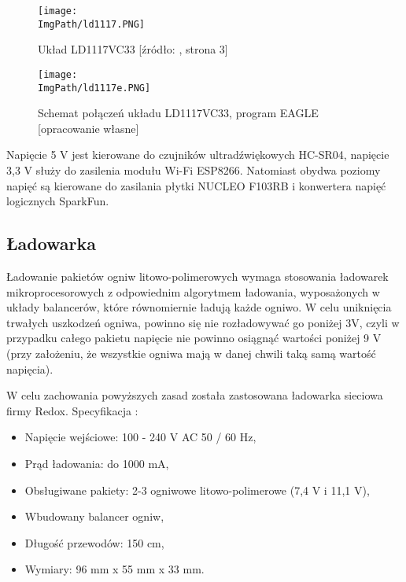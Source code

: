 \documentclass[a4paper,12pt,twoside,openany]{report}
\newcommand{\ImgPath}{.}
\begin{document}
\begin{figure}[!htbp]
	\begin{center}
\centering
\texttt{[image: \\ImgPath/ld1117.PNG]}
\end{center}
	\caption{Układ LD1117VC33 [źródło: \cite{LD1117}, strona 3]}
	\label{schematKomunikacji}
\end{figure}

\begin{figure}[!htbp]
	\begin{center}
\centering
\texttt{[image: \\ImgPath/ld1117e.PNG]}
\end{center}
	\caption{Schemat połączeń układu LD1117VC33, program EAGLE [opracowanie własne]}
	\label{schematKomunikacji}
\end{figure}

\newpage

Napięcie 5 V jest kierowane do czujników ultradźwiękowych HC-SR04, napięcie 3,3 V służy do zasilenia modułu Wi-Fi ESP8266. Natomiast obydwa poziomy napięć są kierowane do zasilania płytki NUCLEO F103RB i konwertera napięć logicznych SparkFun.

\subsection{Ładowarka}

Ładowanie pakietów ogniw litowo-polimerowych wymaga stosowania ładowarek mikroprocesorowych z odpowiednim algorytmem ładowania, wyposażonych w układy balancerów, które równomiernie ładują każde ogniwo. W celu uniknięcia trwałych uszkodzeń ogniwa, powinno się nie rozładowywać go poniżej 3V, czyli w przypadku całego pakietu napięcie nie powinno osiągnąć wartości poniżej 9 V (przy założeniu, że wszystkie ogniwa mają w danej chwili taką samą wartość napięcia).

W celu zachowania powyższych zasad została zastosowana ładowarka sieciowa firmy Redox. Specyfikacja \cite{ladowarka}:
\begin{itemize}
\item Napięcie wejściowe: 100 - 240 V AC 50 / 60 Hz,
\item Prąd ładowania: do 1000 mA,
\item Obsługiwane pakiety: 2-3 ogniwowe litowo-polimerowe (7,4  V i 11,1 V),
\item Wbudowany balancer ogniw,
\item Długość przewodów: 150 cm,
\item Wymiary: 96 mm x 55 mm x 33 mm.
\end{itemize}
\end{document}
